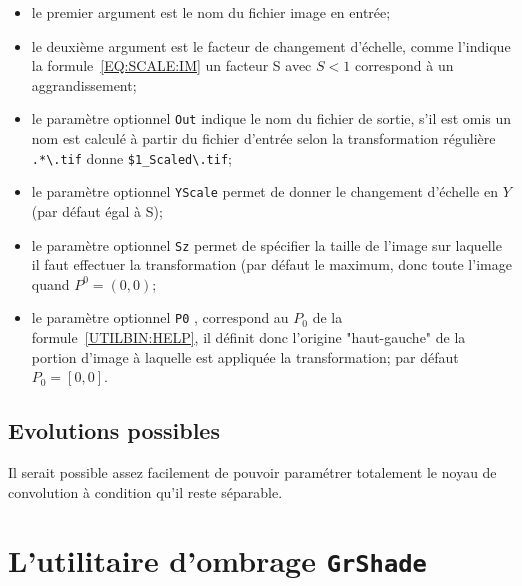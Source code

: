 \begin{itemize}
   \item le premier argument est le nom du fichier image en entr\'ee;

   \item le deuxi\`eme argument est le facteur de changement d'\'echelle,
          comme l'indique la formule~\ref{EQ:SCALE:IM} un facteur S avec  $S<1$
          correspond \`a un aggrandissement;

   \item le param\`etre optionnel {\tt Out}   indique le nom du fichier
         de sortie, s'il est omis un nom est calcul\'e \`a partir
          du fichier d'entr\'ee selon la transformation r\'eguli\`ere
          {\tt .*\verb|\|.tif} donne {\tt \$1\_Scaled\verb|\|.tif};

   \item le param\`etre optionnel {\tt YScale} permet de donner le changement
         d'\'echelle en $Y$ (par d\'efaut \'egal \`a S); 

   \item le param\`etre optionnel {\tt Sz} permet de sp\'ecifier la taille
         de l'image sur laquelle il faut effectuer la transformation (par
         d\'efaut le maximum, donc toute l'image quand $P^0=(0,0)$; 

   \item le param\`etre optionnel {\tt P0}  , correspond au $P_0$ de
          la formule~\ref{UTILBIN:HELP}, il d\'efinit donc l'origine  "haut-gauche"
          de la portion d'image \`a laquelle est appliqu\'ee la transformation;
          par d\'efaut $P_0=[0,0]$.
\end{itemize}

\subsection{Evolutions possibles}

Il serait possible assez facilement de pouvoir  param\'etrer 
totalement le noyau de convolution \`a condition qu'il reste s\'eparable.



\section{L'utilitaire d'ombrage {\tt GrShade}}

